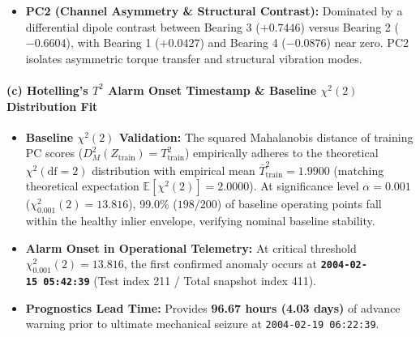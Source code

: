 \begin{tcolorbox}
\begin{itemize}
  \begin{itemize}
  \tightlist
  \item
    Bearing 1: \(+0.5881\)
  \item
    Bearing 2: \(+0.4597\)
  \item
    Bearing 3: \(+0.4334\)
  \item
    Bearing 4: \(+0.5050\) PC1 functions as an energy/load indicator capturing synchronous mechanical vibration driven by rotational shaft dynamics.
  \end{itemize}
\item
  \textbf{PC2 (Channel Asymmetry \& Structural Contrast):} Dominated by a differential dipole contrast between Bearing 3 (\(+0.7446\)) versus Bearing 2 (\(-0.6604\)), with Bearing 1 (\(+0.0427\)) and Bearing 4 (\(-0.0876\)) near zero. PC2 isolates asymmetric torque transfer and structural vibration modes.
\end{itemize}

\paragraph{\texorpdfstring{\textbf{(c) Hotelling's \(T^2\) Alarm Onset Timestamp \& Baseline $\chi^2(2)$ Distribution Fit}}{c}}

\begin{itemize}
\tightlist
\item
  \textbf{Baseline $\chi^2(2)$ Validation:} The squared Mahalanobis distance of training PC scores ($D_M^2(Z_{\text{train}}) = T^2_{\text{train}}$) empirically adheres to the theoretical $\chi^2(\mathrm{df}=2)$ distribution with empirical mean $\bar{T}^2_{\text{train}} = 1.9900$ (matching theoretical expectation $\mathbb{E}[\chi^2(2)] = 2.0000$). At significance level $\alpha = 0.001$ ($\chi^2_{0.001}(2) = 13.816$), 99.0\% ($198/200$) of baseline operating points fall within the healthy inlier envelope, verifying nominal baseline stability.
\item
  \textbf{Alarm Onset in Operational Telemetry:} At critical threshold \(\chi_{0.001}^2(2) = 13.816\), the first confirmed anomaly occurs at \textbf{\texttt{2004-02-15\ 05:42:39}} (Test index 211 / Total snapshot index 411).
\item
  \textbf{Prognostics Lead Time:} Provides \textbf{96.67 hours (4.03 days)} of advance warning prior to ultimate mechanical seizure at \texttt{2004-02-19\ 06:22:39}.
\end{itemize}
\end{tcolorbox}
\vspace{0.3em}

